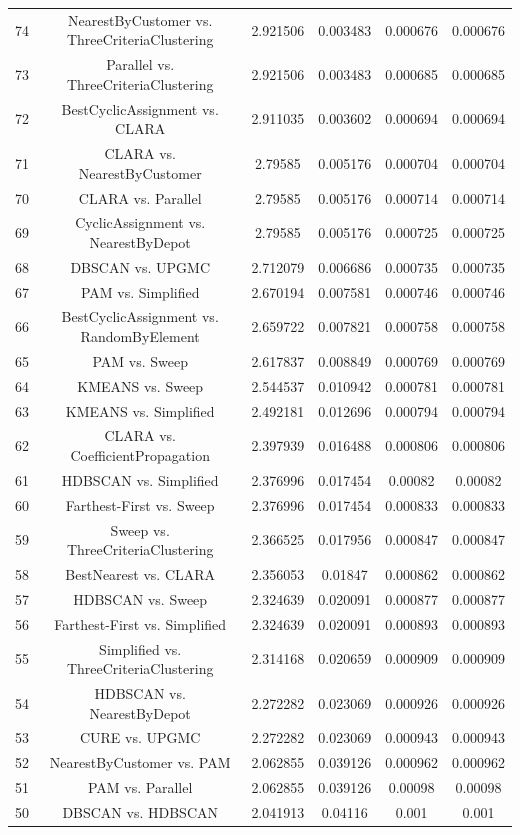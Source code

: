 \documentclass[a4paper,10pt]{article}
\begin{document}
\begin{landscape}
\begin{table}[!htp]
\begin{tabular}{cccccc}
74&NearestByCustomer vs. ThreeCriteriaClustering&2.921506&0.003483&0.000676&0.000676\\
73&Parallel vs. ThreeCriteriaClustering&2.921506&0.003483&0.000685&0.000685\\
72&BestCyclicAssignment vs. CLARA&2.911035&0.003602&0.000694&0.000694\\
71&CLARA vs. NearestByCustomer&2.79585&0.005176&0.000704&0.000704\\
70&CLARA vs. Parallel&2.79585&0.005176&0.000714&0.000714\\
69&CyclicAssignment vs. NearestByDepot&2.79585&0.005176&0.000725&0.000725\\
68&DBSCAN vs. UPGMC&2.712079&0.006686&0.000735&0.000735\\
67&PAM vs. Simplified&2.670194&0.007581&0.000746&0.000746\\
66&BestCyclicAssignment vs. RandomByElement&2.659722&0.007821&0.000758&0.000758\\
65&PAM vs. Sweep&2.617837&0.008849&0.000769&0.000769\\
64&KMEANS vs. Sweep&2.544537&0.010942&0.000781&0.000781\\
63&KMEANS vs. Simplified&2.492181&0.012696&0.000794&0.000794\\
62&CLARA vs. CoefficientPropagation&2.397939&0.016488&0.000806&0.000806\\
61&HDBSCAN vs. Simplified&2.376996&0.017454&0.00082&0.00082\\
60&Farthest-First vs. Sweep&2.376996&0.017454&0.000833&0.000833\\
59&Sweep vs. ThreeCriteriaClustering&2.366525&0.017956&0.000847&0.000847\\
58&BestNearest vs. CLARA&2.356053&0.01847&0.000862&0.000862\\
57&HDBSCAN vs. Sweep&2.324639&0.020091&0.000877&0.000877\\
56&Farthest-First vs. Simplified&2.324639&0.020091&0.000893&0.000893\\
55&Simplified vs. ThreeCriteriaClustering&2.314168&0.020659&0.000909&0.000909\\
54&HDBSCAN vs. NearestByDepot&2.272282&0.023069&0.000926&0.000926\\
53&CURE vs. UPGMC&2.272282&0.023069&0.000943&0.000943\\
52&NearestByCustomer vs. PAM&2.062855&0.039126&0.000962&0.000962\\
51&PAM vs. Parallel&2.062855&0.039126&0.00098&0.00098\\
50&DBSCAN vs. HDBSCAN&2.041913&0.04116&0.001&0.001\\

\end{tabular}
\end{table}
\end{landscape}
\end{document}
